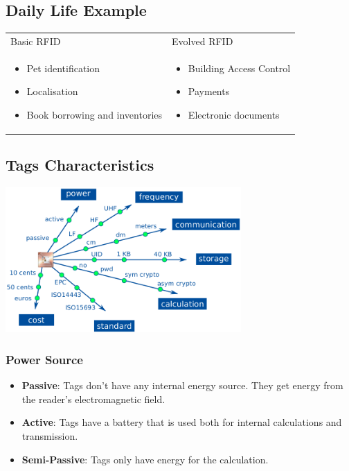 \subsection{Daily Life Example}

\begin{tabular}{m{6cm}m{6cm}}
	Basic RFID & Evolved RFID\\
		\begin{itemize}
    			\item Pet identification
    			\item Localisation
    			\item Book borrowing and inventories
		\end{itemize} &

	\begin{itemize}
			\item Building Access Control
			\item Payments
			\item Electronic documents
		\end{itemize}
\end{tabular}

	
\subsection{Tags Characteristics}
\begin{center}
    \includegraphics[width=9cm]{img/characRFID}
\end{center}

\subsubsection{Power Source}
\begin{itemize}
    \item \textbf{Passive}:  Tags don't have any internal energy source. They
    get energy from the reader's electromagnetic field.
\item \textbf{Active}:  Tags have a battery that is used both for internal
    calculations and transmission.
\item \textbf{Semi-Passive}:  Tags only have energy for the calculation.
\end{itemize}


